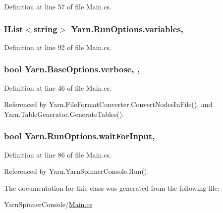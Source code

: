 Definition at line 57 of file Main.\-cs.

\hypertarget{a00144_a2222c73ce5366b02490c6123b711f596}{
\subsubsection[{variables}]{\setlength{\rightskip}{0pt plus 5cm}I\-List$<$string$>$ Yarn.\-Run\-Options.\-variables\hspace{0.3cm}{\ttfamily [get]}, {\ttfamily [set]}}}\label{a00144_a2222c73ce5366b02490c6123b711f596}


Definition at line 92 of file Main.\-cs.

\hypertarget{a00042_ada4d83d1756918f362d55f6649b82b17}{
\subsubsection[{verbose}]{\setlength{\rightskip}{0pt plus 5cm}bool Yarn.\-Base\-Options.\-verbose\hspace{0.3cm}{\ttfamily [get]}, {\ttfamily [set]}, {\ttfamily [inherited]}}}\label{a00042_ada4d83d1756918f362d55f6649b82b17}


Definition at line 46 of file Main.\-cs.



Referenced by Yarn.\-File\-Format\-Converter.\-Convert\-Nodes\-In\-File(), and Yarn.\-Table\-Generator.\-Generate\-Tables().

\hypertarget{a00144_a4b385e83338d14947c4d840d2d1ee266}{
\subsubsection[{wait\-For\-Input}]{\setlength{\rightskip}{0pt plus 5cm}bool Yarn.\-Run\-Options.\-wait\-For\-Input\hspace{0.3cm}{\ttfamily [get]}, {\ttfamily [set]}}}\label{a00144_a4b385e83338d14947c4d840d2d1ee266}


Definition at line 86 of file Main.\-cs.



Referenced by Yarn.\-Yarn\-Spinner\-Console.\-Run().



The documentation for this class was generated from the following file\-:\begin{DoxyCompactItemize}
\item 
Yarn\-Spinner\-Console/\hyperlink{a00303}{Main.\-cs}\end{DoxyCompactItemize}

